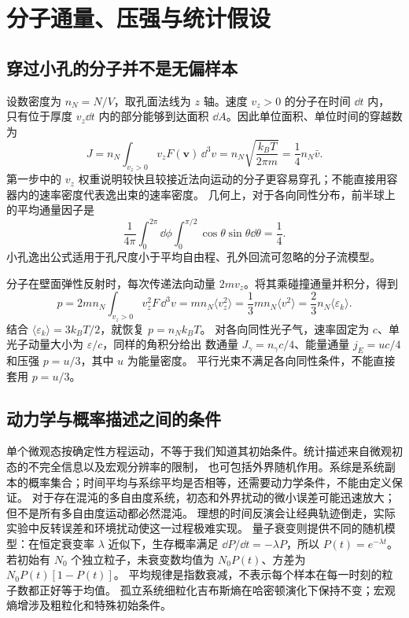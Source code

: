 \section{分子通量、压强与统计假设}

\subsection{穿过小孔的分子并不是无偏样本}

设数密度为 $n_N=N/V$，取孔面法线为 $z$ 轴。速度 $v_z>0$ 的分子在时间 $\dd t$ 内，
只有位于厚度 $v_z\dd t$ 内的部分能够到达面积 $\dd A$。因此单位面积、单位时间的穿越数为
\[J=n_N\int_{v_z>0}v_z F(\boldsymbol v)\,\dd^3v
=n_N\sqrt{\frac{k_BT}{2\pi m}}=\frac14 n_N\bar v.\]
第一步中的 $v_z$ 权重说明较快且较接近法向运动的分子更容易穿孔；不能直接用容器内的速率密度代表逸出束的速率密度。
几何上，对于各向同性分布，前半球上的平均通量因子是
\[\frac1{4\pi}\int_0^{2\pi}\dd\phi\int_0^{\pi/2}\cos\theta\sin\theta\dd\theta=\frac14.\]
小孔逸出公式适用于孔尺度小于平均自由程、孔外回流可忽略的分子流模型。

分子在壁面弹性反射时，每次传递法向动量 $2mv_z$。将其乘碰撞通量并积分，得到
\[p=2mn_N\int_{v_z>0}v_z^2F\,\dd^3v
=mn_N\langle v_z^2\rangle
=\frac13mn_N\langle v^2\rangle=\frac23n_N\langle\varepsilon_k\rangle.\]
结合 $\langle\varepsilon_k\rangle=3k_BT/2$，就恢复 $p=n_Nk_BT$。
对各向同性光子气，速率固定为 $c$、单光子动量大小为 $\varepsilon/c$，同样的角积分给出
数通量 $J_\gamma=n_\gamma c/4$、能量通量 $j_E=uc/4$ 和压强 $p=u/3$，其中 $u$ 为能量密度。
平行光束不满足各向同性条件，不能直接套用 $p=u/3$。

\subsection{动力学与概率描述之间的条件}

单个微观态按确定性方程运动，不等于我们知道其初始条件。统计描述来自微观初态的不完全信息以及宏观分辨率的限制，
也可包括外界随机作用。系综是系统副本的概率集合；时间平均与系综平均是否相等，还需要动力学条件，不能由定义保证。
对于存在混沌的多自由度系统，初态和外界扰动的微小误差可能迅速放大；但不是所有多自由度运动都必然混沌。
理想的时间反演会让经典轨迹倒走，实际实验中反转误差和环境扰动使这一过程极难实现。
量子衰变则提供不同的随机模型：在恒定衰变率 $\lambda$ 近似下，生存概率满足
$\dd P/\dd t=-\lambda P$，所以 $P(t)=e^{-\lambda t}$。
若初始有 $N_0$ 个独立粒子，未衰变数均值为 $N_0P(t)$、方差为 $N_0P(t)[1-P(t)]$。
平均规律是指数衰减，不表示每个样本在每一时刻的粒子数都正好等于均值。
孤立系统细粒化吉布斯熵在哈密顿演化下保持不变；宏观熵增涉及粗粒化和特殊初始条件。

